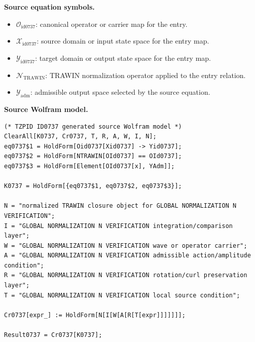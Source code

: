 \begin{minipage}[t]{0.49\linewidth}
\begingroup
\small
\raggedright
\textbf{Source equation symbols.}\par
\begin{itemize}[leftmargin=1.35em,itemsep=1pt,topsep=1pt,parsep=0pt]
    \item $\mathcal{O}_{\mathrm{id0737}}$: canonical operator or carrier map for the entry.
    \item $\mathcal{X}_{\mathrm{id0737}}$: source domain or input state space for the entry map.
    \item $\mathcal{Y}_{\mathrm{id0737}}$: target domain or output state space for the entry map.
    \item $\mathcal{N}_{\mathrm{TRAWIN}}$: TRAWIN normalization operator applied to the entry relation.
    \item $\mathcal{Y}_{\mathrm{adm}}$: admissible output space selected by the source equation.
\end{itemize}
\endgroup
\end{minipage}\hfill
\begin{minipage}[t]{0.47\linewidth}
\begingroup
\scriptsize
\raggedright
\textbf{Source Wolfram model.}\par
\begin{Verbatim}[fontsize=\tiny,breaklines=true,breakanywhere=true]
(* TZPID ID0737 generated source Wolfram model *)
ClearAll[K0737, Cr0737, T, R, A, W, I, N];
eq0737$1 = HoldForm[Oid0737[Xid0737] -> Yid0737];
eq0737$2 = HoldForm[NTRAWIN[OId0737] == OId0737];
eq0737$3 = HoldForm[Element[OId0737[x], YAdm]];

K0737 = HoldForm[{eq0737$1, eq0737$2, eq0737$3}];

N = "normalized TRAWIN closure object for GLOBAL NORMALIZATION N VERIFICATION";
I = "GLOBAL NORMALIZATION N VERIFICATION integration/comparison layer";
W = "GLOBAL NORMALIZATION N VERIFICATION wave or operator carrier";
A = "GLOBAL NORMALIZATION N VERIFICATION admissible action/amplitude condition";
R = "GLOBAL NORMALIZATION N VERIFICATION rotation/curl preservation layer";
T = "GLOBAL NORMALIZATION N VERIFICATION local source condition";

Cr0737[expr_] := HoldForm[N[I[W[A[R[T[expr]]]]]]];

Result0737 = Cr0737[K0737];
\end{Verbatim}
\endgroup
\end{minipage}

